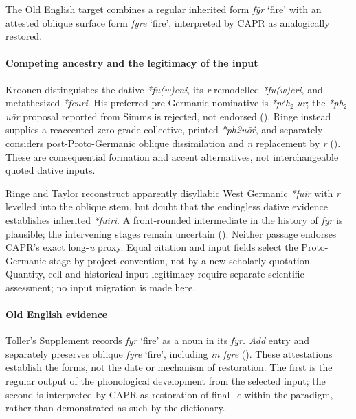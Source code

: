 \documentclass[
  british,
  a4paper,
]{article}
\begin{document}
The Old English target combines a regular inherited form {\emph{fȳr}}
`fire' with an attested oblique surface form {\emph{fȳre}} `fire',
interpreted by CAPR as analogically restored.

\paragraph{Competing ancestry and the legitimacy of the
input}\label{competing-ancestry-and-the-legitimacy-of-the-input}

Kroonen distinguishes the dative \emph{*fu(w)eni}, its
\emph{r}-remodelled \emph{*fu(w)eri}, and metathesized \emph{*feuri}.
His preferred pre-Germanic nominative is \emph{*péh₂-ur}; the
\emph{*ph₂-uōr} proposal reported from Simms is rejected, not endorsed
(). Ringe instead supplies
a reaccented zero-grade collective, printed \emph{*ph2uōŕ}, and
separately considers post-Proto-Germanic oblique dissimilation and
\emph{n} replacement by \emph{r} (). These are consequential formation and accent alternatives,
not interchangeable quoted dative inputs.

Ringe and Taylor reconstruct apparently disyllabic West Germanic
\emph{*fuir} with \emph{r} levelled into the oblique stem, but doubt
that the endingless dative evidence establishes inherited \emph{*fuiri}.
A front-rounded intermediate in the history of \emph{fȳr} is plausible;
the intervening stages remain uncertain
().
Neither passage endorses CAPR's exact long-\emph{ū} proxy. Equal
citation and input fields select the Proto-Germanic stage by project
convention, not by a new scholarly quotation. Quantity, cell and
historical input legitimacy require separate scientific assessment; no
input migration is made here.

\paragraph{Old English evidence}\label{old-english-evidence-153}

Toller's Supplement records {\emph{fyr}} `fire' as a noun in its
\emph{fyr. Add} entry and separately preserves oblique {\emph{fyre}}
`fire', including \emph{in fyre} (). These attestations establish the forms, not the date or mechanism
of restoration. The first is the regular output of the phonological
development from the selected input; the second is interpreted by CAPR
as restoration of final \emph{-e} within the paradigm, rather than
demonstrated as such by the dictionary.
\end{document}
